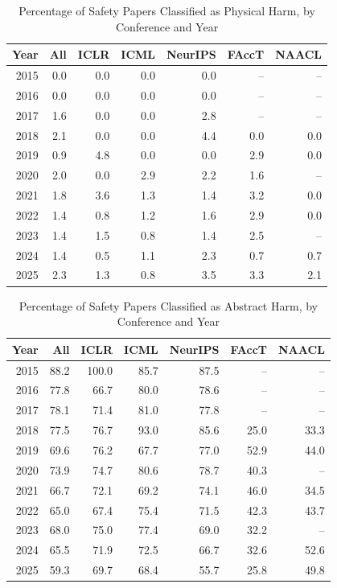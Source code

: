 \begin{table}[ht]
\centering
\caption{Percentage of Safety Papers Classified as Physical Harm, by Conference and Year} 
\label{tab:summary_physical_harm}
\begin{tabular}{rrrrrrr}
  \hline
Year & All & ICLR & ICML & NeurIPS & FAccT & NAACL \\ 
  \hline
2015 & 0.0 & 0.0 & 0.0 & 0.0 & -- & -- \\ 
  2016 & 0.0 & 0.0 & 0.0 & 0.0 & -- & -- \\ 
  2017 & 1.6 & 0.0 & 0.0 & 2.8 & -- & -- \\ 
  2018 & 2.1 & 0.0 & 0.0 & 4.4 & 0.0 & 0.0 \\ 
  2019 & 0.9 & 4.8 & 0.0 & 0.0 & 2.9 & 0.0 \\ 
  2020 & 2.0 & 0.0 & 2.9 & 2.2 & 1.6 & -- \\ 
  2021 & 1.8 & 3.6 & 1.3 & 1.4 & 3.2 & 0.0 \\ 
  2022 & 1.4 & 0.8 & 1.2 & 1.6 & 2.9 & 0.0 \\ 
  2023 & 1.4 & 1.5 & 0.8 & 1.4 & 2.5 & -- \\ 
  2024 & 1.4 & 0.5 & 1.1 & 2.3 & 0.7 & 0.7 \\ 
  2025 & 2.3 & 1.3 & 0.8 & 3.5 & 3.3 & 2.1 \\ 
   \hline
\end{tabular}
\end{table}
\begin{table}[ht]
\centering
\caption{Percentage of Safety Papers Classified as Abstract Harm, by Conference and Year} 
\label{tab:summary_abstract_harm}
\begin{tabular}{rrrrrrr}
  \hline
Year & All & ICLR & ICML & NeurIPS & FAccT & NAACL \\ 
  \hline
2015 & 88.2 & 100.0 & 85.7 & 87.5 & -- & -- \\ 
  2016 & 77.8 & 66.7 & 80.0 & 78.6 & -- & -- \\ 
  2017 & 78.1 & 71.4 & 81.0 & 77.8 & -- & -- \\ 
  2018 & 77.5 & 76.7 & 93.0 & 85.6 & 25.0 & 33.3 \\ 
  2019 & 69.6 & 76.2 & 67.7 & 77.0 & 52.9 & 44.0 \\ 
  2020 & 73.9 & 74.7 & 80.6 & 78.7 & 40.3 & -- \\ 
  2021 & 66.7 & 72.1 & 69.2 & 74.1 & 46.0 & 34.5 \\ 
  2022 & 65.0 & 67.4 & 75.4 & 71.5 & 42.3 & 43.7 \\ 
  2023 & 68.0 & 75.0 & 77.4 & 69.0 & 32.2 & -- \\ 
  2024 & 65.5 & 71.9 & 72.5 & 66.7 & 32.6 & 52.6 \\ 
  2025 & 59.3 & 69.7 & 68.4 & 55.7 & 25.8 & 49.8 \\ 
   \hline
\end{tabular}
\end{table}
